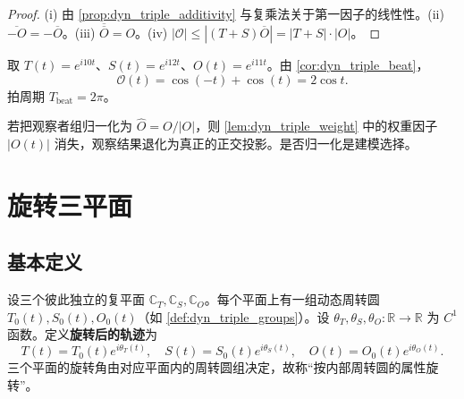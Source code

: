 \begin{proof}
(i) 由 \cref{prop:dyn_triple_additivity} 与复乘法关于第一因子的线性性。(ii) $\overline{-O}=-\overline O$。(iii) $\overline{\overline O}=O$。(iv) $|\mathcal O|\le|(T+S)\overline O|=|T+S|\cdot|O|$。
\end{proof}

\begin{example}[三组动态投影的拍频实例]\label{ex:dyn_triple_beat_example}
取 $T(t)=e^{i10t}$、$S(t)=e^{i12t}$、$O(t)=e^{i11t}$。由 \cref{cor:dyn_triple_beat}，
\[
\mathcal O(t)=\cos(-t)+\cos(t)=2\cos t.
\]
拍周期 $T_{\text{beat}}=2\pi$。
\end{example}

\begin{remark}[归一化与未归一化观察者]\label{rem:dyn_triple_normalisation}
若把观察者组归一化为 $\widehat O=O/|O|$，则 \cref{lem:dyn_triple_weight} 中的权重因子 $|O(t)|$ 消失，观察结果退化为真正的正交投影。是否归一化是建模选择。
\end{remark}

\section{旋转三平面}
\label{sec:dyn_rotating_planes}

\subsection{基本定义}

\begin{definition}[旋转三平面]\label{def:dyn_rotating_planes}
设三个彼此独立的复平面 $\mathbb C_T,\mathbb C_S,\mathbb C_O$。每个平面上有一组动态周转圆 $T_0(t),S_0(t),O_0(t)$（如 \cref{def:dyn_triple_groups}）。设 $\theta_T,\theta_S,\theta_O:\mathbb R\to\mathbb R$ 为 $C^1$ 函数。定义\textbf{旋转后的轨迹}为
\[
T(t)=T_0(t)e^{i\theta_T(t)},\quad
S(t)=S_0(t)e^{i\theta_S(t)},\quad
O(t)=O_0(t)e^{i\theta_O(t)}.
\]
三个平面的旋转角由对应平面内的周转圆组决定，故称“按内部周转圆的属性旋转”。
\end{definition}

